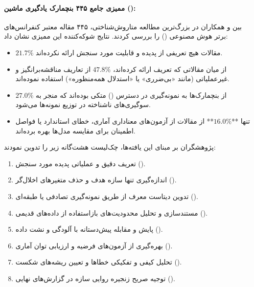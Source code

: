 \paragraph*{ممیزی جامع ۴۴۵ بنچمارک یادگیری ماشین ():}
بین و همکاران در بزرگ‌ترین مطالعه متاروش‌شناختی، ۴۴۵ مقاله معتبر کنفرانس‌های برتر هوش مصنوعی () را بررسی کردند. نتایج شوکه‌کننده این ممیزی نشان داد:
\begin{itemize}
    \item $21.7\%$ مقالات هیچ تعریفی از پدیده و قابلیت مورد سنجش ارائه نکرده‌اند.
    \item از میان مقالاتی که تعریف ارائه کرده‌اند، $47.8\%$ از تعاریف مناقشه‌برانگیز و غیرعملیاتی (مانند «بی‌ضرری» یا «استدلال همه‌منظوره») استفاده نموده‌اند.
    \item $27.0\%$ از بنچمارک‌ها به نمونه‌گیری در دسترس () متکی بوده‌اند که منجر به سوگیری‌های ناشناخته در توزیع نمونه‌ها می‌شود.
    \item تنها **$16.0\%$** از مقالات از آزمون‌های معناداری آماری، خطای استاندارد یا فواصل اطمینان برای مقایسه مدل‌ها بهره برده‌اند.
\end{itemize}
پژوهشگران بر مبنای این یافته‌ها، چک‌لیست هشت‌گانه زیر را تدوین نمودند:
\begin{enumerate}
    \item تعریف دقیق و عملیاتی پدیده مورد سنجش ().
    \item اندازه‌گیری تنها سازه هدف و حذف متغیرهای اخلال‌گر ().
    \item تدوین دیتاست معرف از طریق نمونه‌گیری تصادفی یا طبقه‌ای ().
    \item مستندسازی و تحلیل محدودیت‌های بازاستفاده از داده‌های قدیمی ().
    \item پایش و مقابله پیش‌دستانه با آلودگی و نشت داده ().
    \item بهره‌گیری از آزمون‌های فرضیه و ارزیابی توان آماری ().
    \item تحلیل کیفی و تفکیکی خطاها و تعیین ریشه‌های شکست ().
    \item توجیه صریح زنجیره روایی سازه در گزارش‌های نهایی ().
\end{enumerate}

